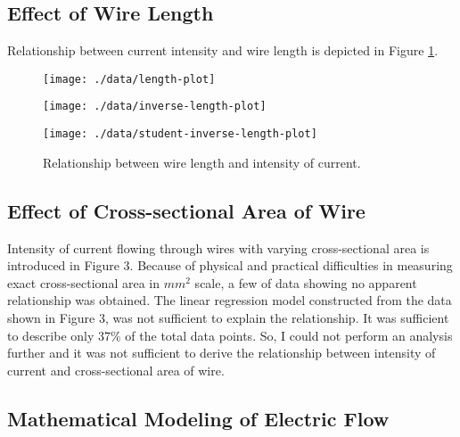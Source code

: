 \subsection{Effect of Wire Length}

Relationship between current intensity and wire length is depicted in Figure \ref{plot:length-current}.

\begin{figure}[!t]
  \centering
  \begin{subfloat}
    {
      \texttt{[image: ./data/length-plot]}
    }
  \end{subfloat}

  \begin{subfloat}[][Inverse of wire length-current data and linear regression model: $\frac{1}{y} = 0.0203x + 0.0416, R^2 = 0.725$. $y$ denotes current, $x$ denotes wire length in meters.]
    {
      \texttt{[image: ./data/inverse-length-plot]}
    }
  \end{subfloat}

  \hfill

  \begin{subfloat}
    {
      \texttt{[image: ./data/student-inverse-length-plot]}
    }
  \end{subfloat}

  \caption{Relationship between wire length and intensity of current.}
  \label{plot:length-current}
\end{figure}

\subsection{Effect of Cross-sectional Area of Wire}

Intensity of current flowing through wires with varying cross-sectional area is introduced in Figure 3.
Because of physical and practical difficulties in measuring exact cross-sectional area in $mm^2$ scale, a few of data showing no apparent relationship was obtained.
The linear regression model constructed from the data shown in Figure 3, was not sufficient to explain the relationship.
It was sufficient to describe only 37\% of the total data points.
So, I could not perform an analysis further and it was not sufficient to derive the relationship between intensity of current and cross-sectional area of wire.

\subsection{Mathematical Modeling of Electric Flow}
\label{subsection:derivation}
